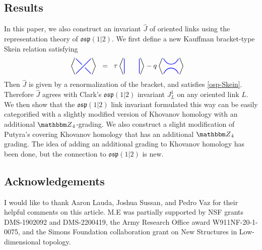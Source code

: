 \documentclass{amsart}
\newcommand{\hackcenter}[1]{
 \xy (0,0)*{#1}; \endxy}
\theoremstyle{plain}
\theoremstyle{definition}
\theoremstyle{definition}
\numberwithin{equation}{section}
\numberwithin{theorem}{section}
\def\mf{\mathfrak}
\numberwithin{equation}{section}
\let\hat=\widehat
\def\Z{{\mathbbm Z}}
\begin{document}
\subsection{Results}
In this paper, we also construct an invariant $\hat{J}$ of oriented links using the representation theory of $\mf{osp}(1|2)$.
We first define a new Kauffman bracket-type Skein relation satisfying
\begin{align*}
   \left\langle
\hackcenter{ \begin{tikzpicture} [scale=.75]
\draw[thick,   blue] (0,0) to (1,1);
\draw[thick,   blue] (1,0) to (.6,.4);
\draw[thick,   blue] (0,1) to (.4,.6);
\end{tikzpicture}}
\right\rangle
\;\;&=\;\;
\tau \left\langle
\hackcenter{ \begin{tikzpicture} [scale=.75]
\draw[thick,   blue] (0,0) to (0,1);
\draw[thick,   blue] (1,0) to (1,1);
\end{tikzpicture}}
\right\rangle
-q\left\langle
\hackcenter{ \begin{tikzpicture} [scale=.75]
\draw[thick,   blue] (0,0).. controls ++(.25,.5) and ++(-.25,.5).. (1,0);
\draw[thick,   blue] (0,1).. controls ++(.25,-.5) and ++(-.25,-.5).. (1,1);
\end{tikzpicture}}
\right\rangle
\end{align*}
Then $\hat{J}$ is given by a renormalization of the bracket, and satisfies \ref{osp-Skein}.
Therefore $\hat{J}$ agrees with Clark's $\mf{osp}(1|2)$ invariant $J_L^1$ on any oriented link $L$.
We then show that the $\mf{osp}(1|2)$ link invariant formulated this way can be easily categorified with a slightly modified version of Khovanov homology with an additional $\Z_4$-grading.
We also construct a slight modification of Putyra's covering Khovanov homology \cite{P} that has an additional $\Z_4$ grading.
The idea of adding an additional grading to Khovanov homology has been done\cite{Man1}, but the connection to $\mf{osp}(1|2)$ is new.




\subsection{Acknowledgements}
I would like to thank Aaron Lauda, Joshua Sussan, and Pedro Vaz for their helpful comments on this article.
M.E was partially supported by NSF grants DMS-1902092 and DMS-2200419, the Army Research Office award W911NF-20-1-0075, and the Simons Foundation collaboration grant on New Structures in Low-dimensional topology.
\end{document}
